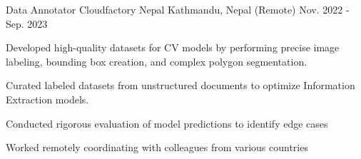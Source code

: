 

\begin{cventries}

  \cventry
    {Data Annotator} %
    {Cloudfactory Nepal} %
    {Kathmandu, Nepal (Remote)} %
    {Nov. 2022 - Sep. 2023} %
    {
      \begin{cvitems} %
        \item {Developed high-quality datasets for CV models by performing precise image labeling, bounding box creation, and complex polygon segmentation. }
        \item {Curated labeled datasets from unstructured documents to optimize Information Extraction models.
        }
        \item { Conducted rigorous evaluation of model predictions to identify edge cases}
        \item {Worked remotely coordinating with colleagues from various countries}
      \end{cvitems}
    }


\end{cventries}
